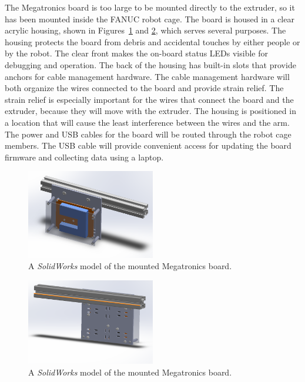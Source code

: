 \indent

The Megatronics board is too large to be mounted directly to the extruder, so it has been mounted inside the FANUC robot cage. The board is housed in a clear acrylic housing, shown in Figures~\ref{fig:megatronics-mount-back} and \ref{fig:megatronics-mount-front}, which serves several purposes. The housing protects the board from debris and accidental touches by either people or by the robot. The clear front makes the on-board status LEDs visible for debugging and operation. The back of the housing has built-in slots that provide anchors for cable management hardware. The cable management hardware will both organize the wires connected to the board and provide strain relief. The strain relief is especially important for the wires that connect the board and the extruder, because they will move with the extruder. The housing is positioned in a location that will cause the least interference between the wires and the arm. The power and USB cables for the board will be routed through the robot cage members. The USB cable will provide convenient access for updating the board firmware and collecting data using a laptop. 

\begin{figure}[htp]
\centering
\includegraphics[width=0.5\textwidth]{./figures/megatronics-mount-1}
\caption{A \emph{SolidWorks} model of the mounted Megatronics board.}
\label{fig:megatronics-mount-back}
\end{figure}

\begin{figure}[htp]
\centering
\includegraphics[width=0.5\textwidth]{./figures/megatronics-mount-2}
\caption{A \emph{SolidWorks} model of the mounted Megatronics board.}
\label{fig:megatronics-mount-front}
\end{figure}


